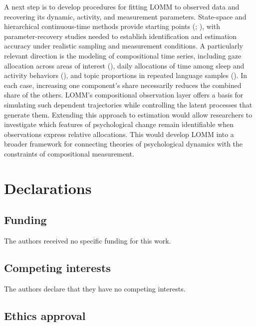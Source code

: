 \documentclass[
]{article}
\begin{document}
A next step is to develop procedures for fitting LOMM to observed data
and recovering its dynamic, activity, and measurement parameters.
State-space and hierarchical continuous-time methods provide starting
points (;
), with parameter-recovery
studies needed to establish identification and estimation accuracy under
realistic sampling and measurement conditions. A particularly relevant
direction is the modeling of compositional time series, including gaze
allocation across areas of interest
(),
daily allocations of time among sleep and activity behaviors
(), and topic
proportions in repeated language samples
(). In each
case, increasing one component's share necessarily reduces the combined
share of the others. LOMM's compositional observation layer offers a
basis for simulating such dependent trajectories while controlling the
latent processes that generate them. Extending this approach to
estimation would allow researchers to investigate which features of
psychological change remain identifiable when observations express
relative allocations. This would develop LOMM into a broader framework
for connecting theories of psychological dynamics with the constraints
of compositional measurement.

\newpage

\section{Declarations}\label{declarations}

\subsection{Funding}\label{funding}

The authors received no specific funding for this work.

\subsection{Competing interests}\label{competing-interests}

The authors declare that they have no competing interests.

\subsection{Ethics approval}\label{ethics-approval}
\end{document}
